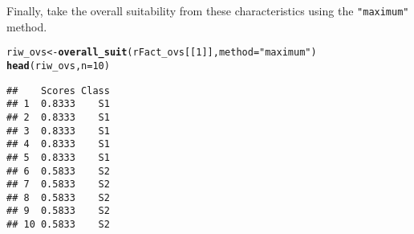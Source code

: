\documentclass[11pt,fleqn]{article}\usepackage[]{graphicx}\usepackage[]{color}
\makeatletter
\newcommand{\hlnum}[1]{\textcolor[rgb]{0.686,0.059,0.569}{#1}}%
\newcommand{\hlstr}[1]{\textcolor[rgb]{0.192,0.494,0.8}{#1}}%
\newcommand{\hlstd}[1]{\textcolor[rgb]{0.345,0.345,0.345}{#1}}%
\newcommand{\hlkwb}[1]{\textcolor[rgb]{0.69,0.353,0.396}{#1}}%
\newcommand{\hlkwc}[1]{\textcolor[rgb]{0.333,0.667,0.333}{#1}}%
\newcommand{\hlkwd}[1]{\textcolor[rgb]{0.737,0.353,0.396}{\textbf{#1}}}%
\newenvironment{kframe}{%
 \def\at@end@of@kframe{}%
 \ifinner\ifhmode%
  \def\at@end@of@kframe{\end{minipage}}%
  \begin{minipage}{\columnwidth}%
 \fi\fi%
 \def\FrameCommand##1{\hskip\@totalleftmargin \hskip-\fboxsep
 \colorbox{shadecolor}{##1}\hskip-\fboxsep
     \hskip-\linewidth \hskip-\@totalleftmargin \hskip\columnwidth}%
 \MakeFramed {\advance\hsize-\width
   \@totalleftmargin\z@ \linewidth\hsize
   \@setminipage}}%
 {\par\unskip\endMakeFramed%
 \at@end@of@kframe}
\newenvironment{knitrout}{}{} %
\makeatother
\begin{document}
Finally, take the overall suitability from these characteristics using the \verb|"maximum"| method.
\begin{knitrout}
\color{fgcolor}\begin{kframe}
\begin{alltt}
\hlstd{riw_ovs} \hlkwb{<-} \hlkwd{overall_suit}\hlstd{(rFact_ovs[[}\hlnum{1}\hlstd{]],} \hlkwc{method} \hlstd{=} \hlstr{"maximum"}\hlstd{)}
\hlkwd{head}\hlstd{(riw_ovs,} \hlkwc{n} \hlstd{=} \hlnum{10}\hlstd{)}
\end{alltt}
\begin{verbatim}
##    Scores Class
## 1  0.8333    S1
## 2  0.8333    S1
## 3  0.8333    S1
## 4  0.8333    S1
## 5  0.8333    S1
## 6  0.5833    S2
## 7  0.5833    S2
## 8  0.5833    S2
## 9  0.5833    S2
## 10 0.5833    S2
\end{verbatim}
\end{kframe}
\end{knitrout}
\newpage
\end{document}
